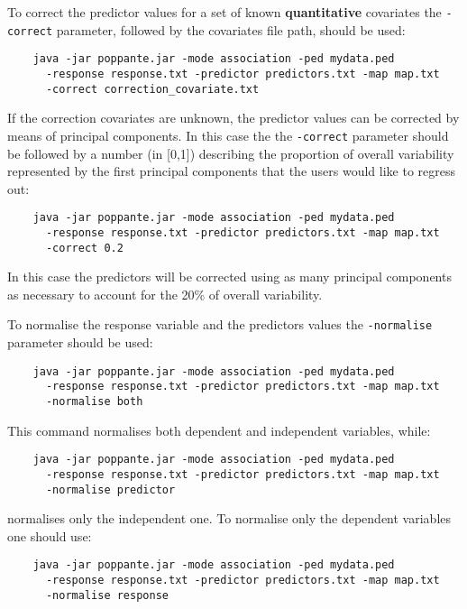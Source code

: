 \documentclass[a4paper,9pt]{article}
\begin{document}
\noindent
To correct the predictor values for a set of known \textbf{quantitative} covariates the \texttt{-correct} parameter, followed by the covariates file path, should be used:
\begin{Verbatim}
	java -jar poppante.jar -mode association -ped mydata.ped 
	  -response response.txt -predictor predictors.txt -map map.txt
	  -correct correction_covariate.txt
\end{Verbatim}

\noindent
If the correction covariates are unknown, the predictor values can be corrected by means of principal components. In this case the the \texttt{-correct} parameter should be followed by a number (in [0,1]) describing the proportion of overall variability represented by the first principal components that the users would like to regress out:
\begin{Verbatim}
	java -jar poppante.jar -mode association -ped mydata.ped 
	  -response response.txt -predictor predictors.txt -map map.txt
	  -correct 0.2
\end{Verbatim}

\noindent 
In this case the predictors will be corrected using as many principal components as necessary to account for the 20\% of overall variability.

\vspace{0.5cm}

\noindent
To normalise the response variable and the predictors values the \texttt{-normalise} parameter should be used:
\begin{Verbatim}
	java -jar poppante.jar -mode association -ped mydata.ped 
	  -response response.txt -predictor predictors.txt -map map.txt
	  -normalise both
\end{Verbatim}
%
This command normalises both dependent and independent variables, while:
\begin{Verbatim}
	java -jar poppante.jar -mode association -ped mydata.ped 
	  -response response.txt -predictor predictors.txt -map map.txt
	  -normalise predictor
\end{Verbatim}
%
normalises only the independent one. To normalise only the dependent variables one should use:
\begin{Verbatim}
	java -jar poppante.jar -mode association -ped mydata.ped 
	  -response response.txt -predictor predictors.txt -map map.txt
	  -normalise response
\end{Verbatim}

\vspace{0.5cm}
\end{document}
